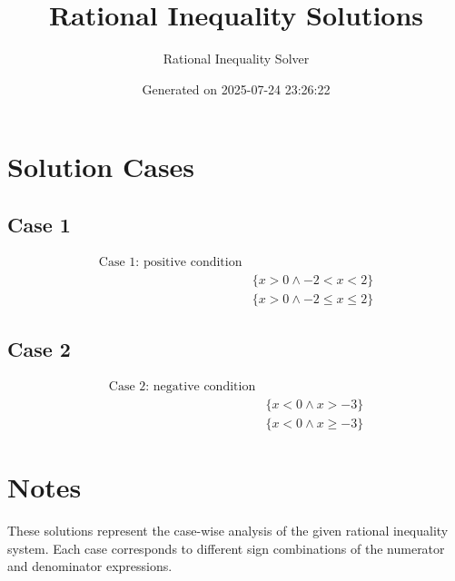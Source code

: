 \documentclass{article}
\title{Rational Inequality Solutions}
\author{Rational Inequality Solver}
\date{Generated on 2025-07-24 23:26:22}
\begin{document}
\maketitle

\section{Solution Cases}

\subsection{Case 1}

\begin{align}
\text{Case 1: positive condition} \\
& \{x > 0 \wedge -2 < x < 2\} \\
& \{x > 0 \wedge -2 \le x \le 2\}
\end{align}

\subsection{Case 2}

\begin{align}
\text{Case 2: negative condition} \\
& \{x < 0 \wedge x > -3\} \\
& \{x < 0 \wedge x \ge -3\}
\end{align}


\section{Notes}

These solutions represent the case-wise analysis of the given rational inequality system. Each case corresponds to different sign combinations of the numerator and denominator expressions.
\end{document}
